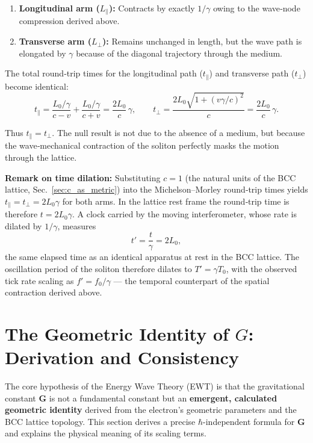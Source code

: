 \documentclass[10pt,a4paper]{article}
\begin{document}
\begin{enumerate}
	\item \textbf{Longitudinal arm ($L_{\parallel}$):} Contracts by exactly
	$1/\gamma$ owing to the wave‑node compression derived above.
	\item \textbf{Transverse arm ($L_{\perp}$):} Remains unchanged in
	length, but the wave path is elongated by $\gamma$ because of the
	diagonal trajectory through the medium.
\end{enumerate}

The total round‑trip times for the longitudinal path ($t_{\parallel}$) and
transverse path ($t_{\perp}$) become identical:
\begin{equation}
	t_{\parallel}
	= \frac{L_0/\gamma}{c - v} + \frac{L_0/\gamma}{c + v}
	= \frac{2L_0}{c}\,\gamma,
	\qquad
	t_{\perp}
	= \frac{2L_0 \sqrt{1 + (v\gamma/c)^{2}}}{c}
	= \frac{2L_0}{c}\,\gamma.
\end{equation}

Thus $t_{\parallel} = t_{\perp}$.  The null result is not due to the
absence of a medium, but because the wave‑mechanical contraction of the
soliton perfectly masks the motion through the lattice.

\noindent

\textbf{Remark on time dilation:} Substituting $c = 1$ (the natural
units of the BCC lattice, Sec.~\ref{sec:c_as_metric}) into the
Michelson–Morley round‑trip times yields $t_{\parallel} = t_{\perp}
= 2L_0\gamma$ for both arms.  In the lattice rest frame the
round‑trip time is therefore $t = 2L_0\gamma$.  A clock carried by
the moving interferometer, whose rate is dilated by $1/\gamma$,
measures
\[
t' = \frac{t}{\gamma} = 2L_0,
\]
the same elapsed time as an identical apparatus at rest in the BCC
lattice.  The oscillation period of the soliton therefore dilates
to $T' = \gamma T_0$, with the observed tick rate scaling as
$f' = f_0/\gamma$ — the temporal counterpart of the spatial
contraction derived above.

\section{The Geometric Identity of $G$: Derivation and Consistency}
\label{sec:geometric_identity}

The core hypothesis of the Energy Wave Theory (EWT) is that the gravitational constant $\mathbf{G}$ is not a fundamental constant but an \textbf{emergent, calculated geometric identity} derived from the electron's geometric parameters and the BCC lattice topology. This section derives a precise $\hbar$-independent formula for $\mathbf{G}$ and explains the physical meaning of its scaling terms.
\end{document}
